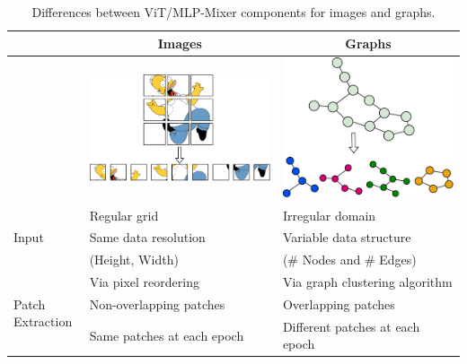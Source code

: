 \documentclass{article}
\begin{document}
\begin{table}[t]
    \caption{Differences between ViT/MLP-Mixer components for images and graphs. }
    
    \centering    
    \begin{tabular}{lll}
    \toprule
           & \multicolumn{1}{c}{Images}   & \multicolumn{1}{c}{Graphs} \\
         \midrule
           & 
         \begin{minipage}{.3\textwidth}
         \includegraphics[width=0.9\linewidth]{figs/image_cartoon.pdf}
         \end{minipage} & 
         \begin{minipage}{.3\textwidth}
         \centering
         \includegraphics[width=0.8\linewidth]{figs/graph.pdf}
         \end{minipage} 
         \\
         \midrule
         \multirow{3}{*}{Input} 
         & Regular grid & Irregular domain \\
         & Same data resolution &  Variable data structure  \\
         & \quad (Height, Width) & \quad (\# Nodes and \# Edges) \\
         \midrule
        \multirow{3}{*}{Patch Extraction}  
        & Via pixel reordering  & %
        {Via graph clustering algorithm} \\
        & Non-overlapping patches &  %
        {Overlapping patches} \\
        & Same patches at each epoch  & %
        {Different patches at each epoch} \\
        

\end{tabular}
\end{table}
\end{document}
